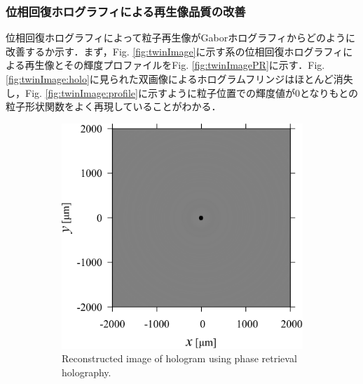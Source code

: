 \subsubsection{位相回復ホログラフィによる再生像品質の改善}
位相回復ホログラフィによって粒子再生像がGaborホログラフィからどのように改善するか示す．まず，Fig. \ref{fig:twinImage}に示す系の位相回復ホログラフィによる再生像とその輝度プロファイルをFig. \ref{fig:twinImagePR}に示す．Fig. \ref{fig:twinImage:holo}に見られた双画像によるホログラムフリンジはほとんど消失し，Fig. \ref{fig:twinImage:profile}に示すように粒子位置での輝度値が0となりもとの粒子形状関数をよく再現していることがわかる．
\begin{figure}[htbp]
    \centering
    \begin{subfigure}[t]{0.48\linewidth}
        \includegraphics[width=\linewidth]{./Figure/2_Theory/PR_twin_image/prrec.pdf}
        \caption{Reconstructed image of hologram using phase retrieval holography.}
        \label{fig:twinImagePR:holo}
    \end{subfigure}
    \hfill
    \begin{subfigure}[t]{0.48\linewidth}

\end{subfigure}
\end{figure}
